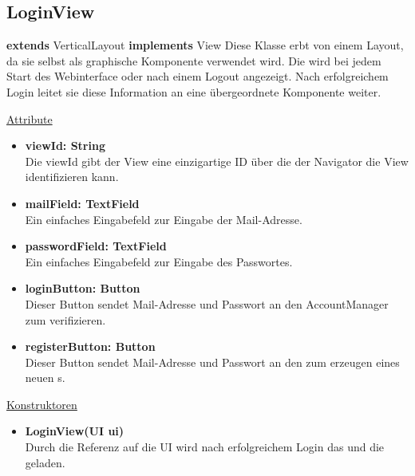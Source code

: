 \newpage
\subsection{LoginView}\label{LoginView}
\textbf{extends}  VerticalLayout \newline
\textbf{implements} View \newline
Diese Klasse erbt von einem Layout, da sie selbst als graphische Komponente verwendet wird. Die  wird bei jedem Start des Webinterface oder nach einem Logout angezeigt. Nach erfolgreichem Login leitet sie diese Information an eine übergeordnete Komponente weiter.
\newline

\underline{Attribute}
\begin{itemize}
\itemsep0pt
\item \textbf{viewId: String} \hfill\\ 
Die viewId gibt der View eine einzigartige ID über die der Navigator die View identifizieren kann.

\item \textbf{mailField: TextField} \hfill\\ 
Ein einfaches Eingabefeld zur Eingabe der Mail-Adresse.

\item \textbf{passwordField: TextField} \hfill\\
Ein einfaches Eingabefeld zur Eingabe des Passwortes.

\item \textbf{loginButton: Button} \hfill\\
Dieser Button sendet Mail-Adresse und Passwort an den AccountManager zum verifizieren.

\item \textbf{registerButton: Button} \hfill\\
Dieser Button sendet Mail-Adresse und Passwort an den  zum erzeugen eines neuen s.

\end{itemize}

\underline{Konstruktoren}
\begin{itemize}
\itemsep0pt
\item \textbf{LoginView(UI ui)} \hfill\\
Durch die Referenz auf die UI wird nach erfolgreichem Login das  und die  geladen.
\end{itemize}

